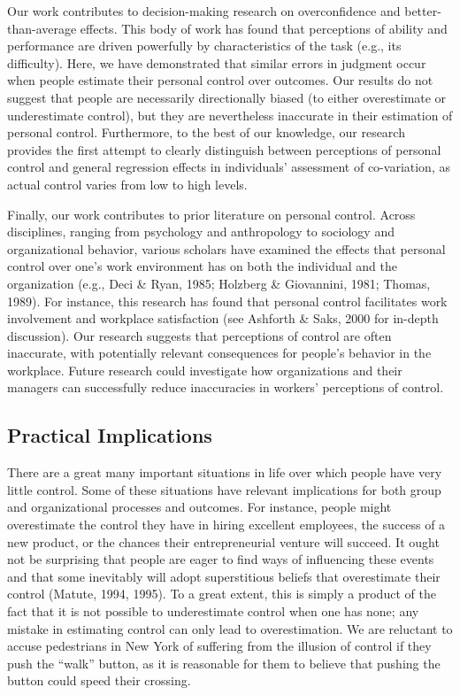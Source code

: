 \documentclass[USenglish,letterpaper,12pt,extrafontsizes,oneside,onecolumn,final]{memoir}
\begin{document}
Our work contributes to decision-making research on overconfidence and better-than-average effects. This body of work has found that perceptions of ability and performance are driven powerfully by characteristics of the task (e.g., its difficulty). Here, we have demonstrated that similar errors in judgment occur when people estimate their personal control over outcomes. Our results do not suggest that people are necessarily directionally biased (to either overestimate or underestimate control), but they are nevertheless inaccurate in their estimation of personal control. Furthermore, to the best of our knowledge, our research provides the first attempt to clearly distinguish between perceptions of personal control and general regression effects in individuals' assessment of co-variation, as actual control varies from low to high levels. 

Finally, our work contributes to prior literature on personal control. Across disciplines, ranging from psychology and anthropology to sociology and organizational behavior, various scholars have examined the effects that personal control over one's work environment has on both the individual and the organization (e.g., Deci \& Ryan, 1985; Holzberg \& Giovannini, 1981; Thomas, 1989). For instance, this research has found that personal control facilitates work involvement and workplace satisfaction (see Ashforth \& Saks, 2000 for in-depth discussion). Our research suggests that perceptions of control are often inaccurate, with potentially relevant consequences for people's behavior in the workplace. Future research could investigate how organizations and their managers can successfully reduce inaccuracies in workers' perceptions of control.  

\subsection{Practical Implications}
There are a great many important situations in life over which people have very little control. Some of these situations have relevant implications for both group and organizational processes and outcomes. For instance, people might overestimate the control they have in hiring excellent employees, the success of a new product, or the chances their entrepreneurial venture will succeed. It ought not be surprising that people are eager to find ways of influencing these events and that some inevitably will adopt superstitious beliefs that overestimate their control (Matute, 1994, 1995). To a great extent, this is simply a product of the fact that it is not possible to underestimate control when one has none; any mistake in estimating control can only lead to overestimation. We are reluctant to accuse pedestrians in New York of suffering from the illusion of control if they push the ``walk'' button, as it is reasonable for them to believe that pushing the button could speed their crossing. 
\end{document}
